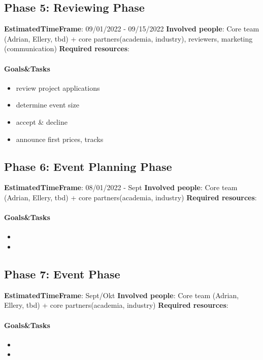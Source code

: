 \subsection*{Phase 5: Reviewing Phase}
\textbf{EstimatedTimeFrame}:
09/01/2022 - 09/15/2022
\textbf{Involved people}:
Core team (Adrian, Ellery, tbd) + core partners(academia, industry), reviewers, marketing (communication)
\textbf{Required resources}:


\paragraph{Goals\&Tasks}
\begin{itemize}
    \item review project applications
    \item determine event size
    \item accept \& decline
    \item announce first prices, tracks
\end{itemize}

\subsection*{Phase 6: Event Planning Phase}
\textbf{EstimatedTimeFrame}:
08/01/2022 - Sept
\textbf{Involved people}:
Core team (Adrian, Ellery, tbd) + core partners(academia, industry)
\textbf{Required resources}:


\paragraph{Goals\&Tasks}
\begin{itemize}
    \item 
    \item 
\end{itemize}

\subsection*{Phase 7: Event Phase}
\textbf{EstimatedTimeFrame}:
Sept/Okt
\textbf{Involved people}:
Core team (Adrian, Ellery, tbd) + core partners(academia, industry)
\textbf{Required resources}:


\paragraph{Goals\&Tasks}
\begin{itemize}
    \item
    \item
\end{itemize}

